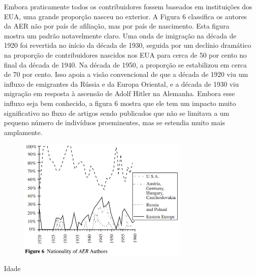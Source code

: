 \documentclass[12pt]{article}
\begin{document}
Embora praticamente todos os contribuidores fossem baseados em instituições dos EUA, uma grande proporção nasceu no exterior. A Figura 6 classifica os autores da AER não por país de afiliação, mas por país de nascimento. Esta figura mostra um padrão notavelmente claro. Uma onda de imigração na década de 1920 foi revertida no início da década de 1930, seguida por um declínio dramático na proporção de contribuidores nascidos nos EUA para cerca de 50 por cento no final da década de 1940. Na década de 1950, a proporção se estabilizou em cerca de 70 por cento. Isso apoia a visão convencional de que a década de 1920 viu um influxo de emigrantes da Rússia e da Europa Oriental, e a década de 1930 viu migração em resposta à ascensão de Adolf Hitler na Alemanha. Embora esse influxo seja bem conhecido, a figura 6 mostra que ele tem um impacto muito significativo no fluxo de artigos sendo publicados que não se limitava a um pequeno número de indivíduos proeminentes, mas se estendia muito mais amplamente.

\begin{figure}[H]
    \centering
    \includegraphics[width=0.75\textwidth]{figure 6.png}
    \end{figure}

Idade
\end{document}

